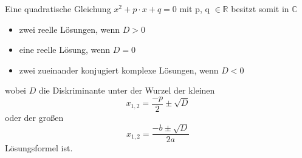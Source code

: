 \extrapar

Eine quadratische Gleichung $x^2 + p \cdot x + q = 0$ mit p, q $\in \mathbb{R}$ besitzt somit in $\mathbb{C}$

\begin{itemize}
	\item zwei reelle L\"{o}sungen, wenn $D > 0$
	\item eine reelle L\"{o}sung, wenn $D = 0$
	\item zwei zueinander konjugiert komplexe L\"{o}sungen, wenn $D < 0$
\end{itemize}

wobei $D$ die Diskriminante unter der Wurzel der kleinen $$ x_{1, 2} = \frac{-p}{2} \pm \sqrt{D}$$ oder der gro\ss{}en $$ x_{1, 2} = \frac{-b \pm \sqrt{D}}{2a}$$ L\"{o}sungsformel ist.

